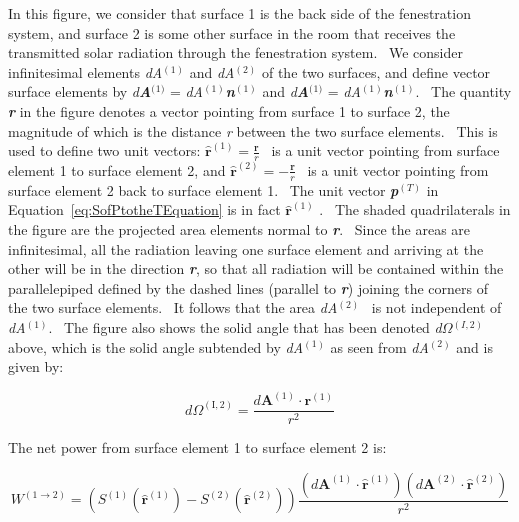 In this figure, we consider that surface 1 is the back side of the fenestration system, and surface 2 is some other surface in the room that receives the transmitted solar radiation through the fenestration system.~ We consider infinitesimal elements \emph{dA}\(^{(1)}\) and \emph{dA}\(^{(2)}\) of the two surfaces, and define vector surface elements by \emph{d\textbf{A}}\textbf{\(^{(}\)}\(^{1)}\) = \emph{dA}\(^{(1)}\)\textbf{\emph{n}}\(^{(1)}\) and \emph{d\textbf{A}}\textbf{\(^{(}\)}\(^{1)}\) = \emph{dA}\(^{(1)}\)\textbf{\emph{n}}\(^{(1)}\).~ The quantity \textbf{\emph{r}} in the figure denotes a vector pointing from surface 1 to surface 2, the magnitude of which is the distance \emph{r} between the two surface elements.~ This is used to define two unit vectors: \({{\mathbf{\hat r}}^{{\mathrm{(1)}}}} = {\frac{{\mathbf{r}}}{r}}\) ~is a unit vector pointing from surface element 1 to surface element 2, and \({{\mathbf{\hat r}}^{{\mathrm{(2)}}}} = - {\frac{{\mathbf{r}}}{r}}\) ~is a unit vector pointing from surface element 2 back to surface element 1.~ The unit vector \textbf{\emph{p}}\(^{(T)}\) in Equation~\ref{eq:SofPtotheTEquation} is in fact \({{\mathbf{\hat r}}^{{\mathrm{(1)}}}}\) .~ The shaded quadrilaterals in the figure are the projected area elements normal to \textbf{\emph{r}}.~ Since the areas are infinitesimal, all the radiation leaving one surface element and arriving at the other will be in the direction \textbf{\emph{r}}, so that all radiation will be contained within the parallelepiped defined by the dashed lines (parallel to \textbf{\emph{r}}) joining the corners of the two surface elements.~ It follows that the area \emph{dA}\(^{(2)}\)~ is not independent of \emph{dA}\(^{(1)}\).~ The figure also shows the solid angle that has been denoted \emph{d}\(\Omega\)\(^{(I,2)}\) above, which is the solid angle subtended by \emph{dA}\(^{(1)}\) as seen from \emph{dA}\(^{(2)}\) and is given by:

\begin{equation}
d{\Omega ^{{\mathrm{(I,2)}}}} = \frac{{d{{\mathbf{A}}^{{\mathrm{(1)}}}} \cdot {{\mathbf{r}}^{{\mathrm{(1)}}}}}}{{{r^2}}}
\label{eq:dOmegaI2Equation}
\end{equation}

The net power from surface element 1 to surface element 2 is:

\begin{equation}
{W^{(1 \to 2)}} = \left( {{S^{{\mathrm{(1)}}}}({{{\mathbf{\hat r}}}^{{\mathrm{(1)}}}}) - {S^{{\mathrm{(2)}}}}({{{\mathbf{\hat r}}}^{{\mathrm{(2)}}}})} \right)\frac{{\left( {d{{\mathbf{A}}^{{\mathrm{(1)}}}} \cdot {{{\mathbf{\hat r}}}^{{\mathrm{(1)}}}}} \right)\left( {d{{\mathbf{A}}^{{\mathrm{(2)}}}} \cdot {{{\mathbf{\hat r}}}^{{\mathrm{(2)}}}}} \right)}}{{{r^2}}}
\end{equation}

